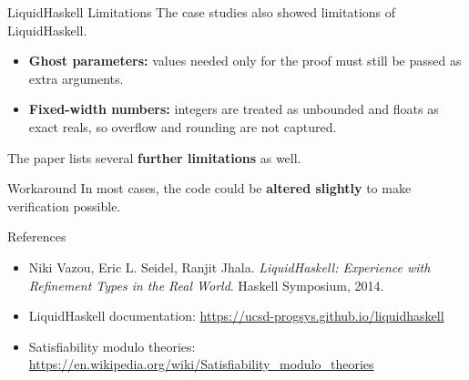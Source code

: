 \documentclass[aspectratio=169]{beamer}
\begin{document}
\begin{frame}{LiquidHaskell Limitations}
	The case studies also showed limitations of LiquidHaskell.

	\begin{itemize}
		\item \textbf{Ghost parameters:} values needed only for the proof must still be passed as extra arguments.
		\item \textbf{Fixed-width numbers:} integers are treated as unbounded and floats as exact reals, so overflow and rounding are not captured.
	\end{itemize}

	The paper lists several \textbf{further limitations} as well.

	\begin{exampleblock}{Workaround}
		\vspace{0.1em}
		In most cases, the code could be \textbf{altered slightly} to make verification possible.
	\end{exampleblock}
\end{frame}

\begin{frame}{References}
	\small
	\begin{itemize}
		\item Niki Vazou, Eric L. Seidel, Ranjit Jhala. \emph{LiquidHaskell: Experience with Refinement Types in the Real World}. Haskell Symposium, 2014.
		\item LiquidHaskell documentation: \url{https://ucsd-progsys.github.io/liquidhaskell}
		\item Satisfiability modulo theories: \url{https://en.wikipedia.org/wiki/Satisfiability_modulo_theories}
	\end{itemize}
\end{frame}
\end{document}
